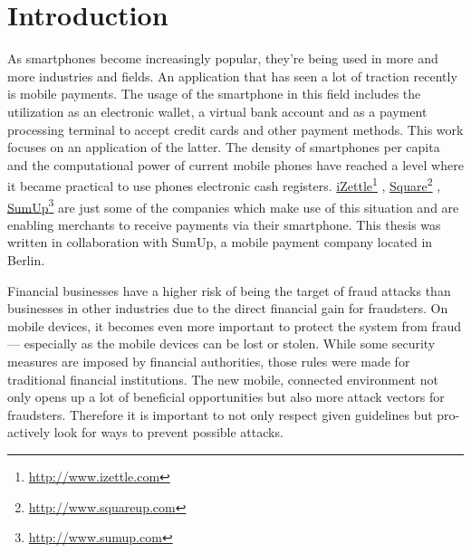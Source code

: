 \documentclass[a4paper, oneside]{csthesis}
\newcommand\fnurl[2]{%
  \href{#2}{#1}\footnote{\url{#2}}%
}
\begin{document}
\tableofcontents

\mainmatter %



\chapter{Introduction}

As smartphones become increasingly popular, they're being used in more and more industries and fields. An application that has seen a lot of traction recently is mobile payments. The usage of the smartphone in this field includes the utilization as an electronic wallet, a virtual bank account and as a payment processing terminal to accept credit cards and other payment methods.
This work focuses on an application of the latter.
The density of smartphones per capita and the computational power of current mobile phones have reached a level where it became practical to use phones electronic cash registers.
\fnurl{iZettle}{http://www.izettle.com}, \fnurl{Square}{http://www.squareup.com}, \fnurl{SumUp}{http://www.sumup.com} are just some of the companies which make use of this situation and are enabling merchants to receive payments via their smartphone. This thesis was written in collaboration with SumUp, a mobile payment company located in Berlin.


Financial businesses have a higher risk of being the target of fraud attacks than businesses in other industries due to the direct financial gain for fraudsters. On mobile devices, it becomes even more important to protect the system from fraud --- especially as the mobile devices can be lost or stolen. While some security measures are imposed by financial authorities, those rules were made for traditional financial institutions. The new mobile, connected environment not only opens up a lot of beneficial opportunities but also more attack vectors for fraudsters. Therefore it is important to not only respect given guidelines but pro-actively look for ways to prevent possible attacks.
\end{document}
